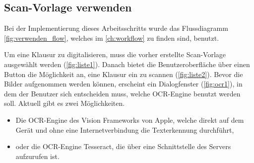 \documentclass[notables, nomenclature, oneside, 150]{HSMW-Thesis}
\begin{document}
		\subsection{Scan-Vorlage verwenden}
			Bei der Implementierung dieses Arbeitsschritts wurde das Flussdiagramm \ref{fig:verwenden_flow}, welches im \autoref{ch:workflow} zu finden sind, benutzt.
			
			Um eine Klausur zu digitalisieren, muss die vorher erstellte Scan-Vorlage ausgewählt werden (\ref{fig:liste1}). Danach bietet die Benutzeroberfläche über einen Button die Möglichkeit an, eine Klausur ein zu scannen (\ref{fig:liste2}). Bevor die Bilder aufgenommen werden können, erscheint ein Dialogfenster (\ref{fig:ocr1}), in dem der Benutzer sich entscheiden muss, welche OCR-Engine benutzt werden soll. Aktuell gibt es zwei Möglichkeiten.
			\begin{itemize}
				\item Die OCR-Engine des Vision Frameworks von Apple, welche direkt auf dem Gerät und ohne eine Internetverbindung die Texterkennung durchführt,  
				\item oder die OCR-Engine Tesseract, die über eine Schnittstelle des Servers aufzurufen ist.
			\end{itemize}
				
\end{document}
